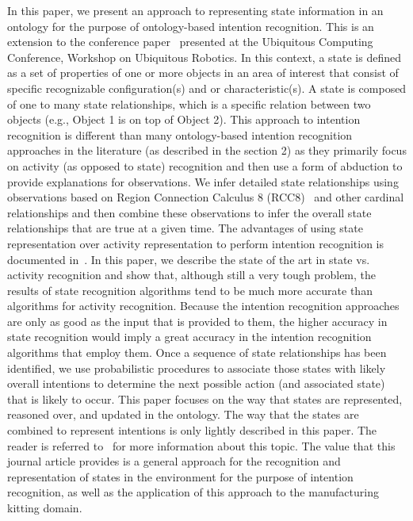 \documentclass[preprint,12pt]{elsarticle}
\begin{document}
In this paper, we present an approach to representing state information in an ontology for the purpose of ontology-based intention recognition. This is an extension to the conference paper~\cite{SCHLENOFF.UBICOMP.2012} presented at the Ubiquitous Computing Conference, Workshop on Ubiquitous Robotics. In this context, a state is defined as a set of properties of one or more objects in an area of interest that consist of specific recognizable configuration(s) and or characteristic(s). A state is composed of one to many state relationships, which is a specific relation between two objects (e.g., Object 1 is on top of Object 2). This approach to intention recognition is different than many ontology-based intention recognition approaches in the literature (as described in the section 2) as they primarily focus on activity (as opposed to state) recognition and then use a form of abduction to provide explanations for observations. We infer detailed state relationships using observations based on Region Connection Calculus 8 (RCC8)~\cite{RANDELL.ICKRR.1992} and other cardinal relationships and then combine these observations to infer the overall state relationships that are true at a given time. The advantages of using state representation over activity representation to perform intention recognition is documented in~\cite{SCHLENOFF.ECDRM.2012}. In this paper, we describe the state of the art in state vs. activity recognition and show that, although still a very tough problem, the results of state recognition algorithms tend to be much more accurate than algorithms for activity recognition. Because the intention recognition approaches are only as good as the input that is provided to them, the higher accuracy in state recognition would imply a great accuracy in the intention recognition algorithms that employ them. Once a sequence of state relationships has been identified, we use probabilistic procedures to associate those states with likely overall intentions to determine the next possible action (and associated state) that is likely to occur. This paper focuses on the way that states are represented, reasoned over, and updated in the ontology. The way that the states are combined to represent intentions is only lightly described in this paper. The reader is referred to~\cite{SCHLENOFF.ECDRM.2012} for more information about this topic. The value that this journal article provides is a general approach for the recognition and representation of states in the environment for the purpose of intention recognition, as well as the application of this approach to the manufacturing kitting domain.
\end{document}

